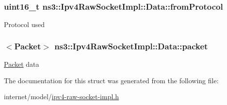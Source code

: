 \subsubsection[{\texorpdfstring{from\+Protocol}{fromProtocol}}]{\setlength{\rightskip}{0pt plus 5cm}uint16\+\_\+t ns3\+::\+Ipv4\+Raw\+Socket\+Impl\+::\+Data\+::from\+Protocol}\hypertarget{structns3_1_1Ipv4RawSocketImpl_1_1Data_a95ad24e97c6e8e0a0136c48ff0556b14}{}\label{structns3_1_1Ipv4RawSocketImpl_1_1Data_a95ad24e97c6e8e0a0136c48ff0556b14}
Protocol used 
\subsubsection[{\texorpdfstring{packet}{packet}}]{$<${\bf Packet}$>$ ns3\+::\+Ipv4\+Raw\+Socket\+Impl\+::\+Data\+::packet}\hypertarget{structns3_1_1Ipv4RawSocketImpl_1_1Data_afbbbc75b177a582c5f3ecaddc6245ba3}{}\label{structns3_1_1Ipv4RawSocketImpl_1_1Data_afbbbc75b177a582c5f3ecaddc6245ba3}
\hyperlink{classns3_1_1Packet}{Packet} data 

The documentation for this struct was generated from the following file\+:\begin{DoxyCompactItemize}
\item 
internet/model/\hyperlink{ipv4-raw-socket-impl_8h}{ipv4-\/raw-\/socket-\/impl.\+h}\end{DoxyCompactItemize}
